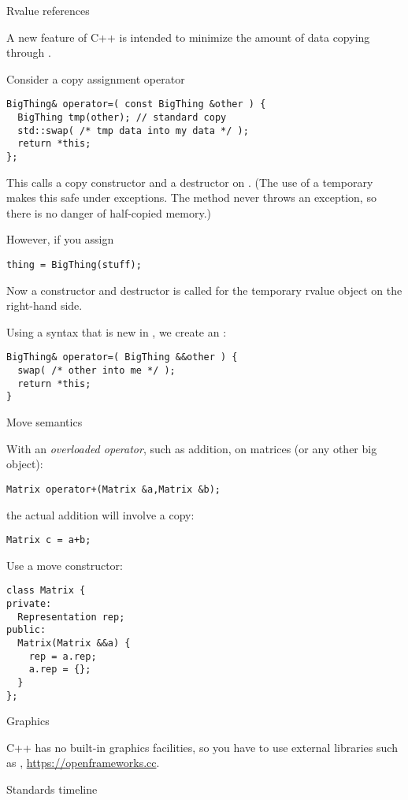  {Rvalue references}
\label{sec:rvalue-ref}

A new feature of C++ is
intended to minimize the amount of data copying through
.

Consider a copy assignment operator
\begin{lstlisting}
BigThing& operator=( const BigThing &other ) {
  BigThing tmp(other); // standard copy
  std::swap( /* tmp data into my data */ );
  return *this;
};
\end{lstlisting}
This calls a copy constructor and a destructor on . (The use of
a temporary makes this safe under exceptions. The 
method never throws an exception, so there is no danger of half-copied
memory.)

However, if you assign
\begin{lstlisting}
thing = BigThing(stuff);
\end{lstlisting}
Now a constructor and destructor is called for the temporary rvalue object on
the right-hand side.

Using a syntax that is new in , we create an
:
\begin{lstlisting}
BigThing& operator=( BigThing &&other ) {
  swap( /* other into me */ );
  return *this;
}
\end{lstlisting}

 {Move semantics}

With an
\emph{overloaded operator},
such as addition,
on matrices (or any other big object):
\begin{lstlisting}
Matrix operator+(Matrix &a,Matrix &b);
\end{lstlisting}
the actual addition will involve a copy:
\begin{lstlisting}
Matrix c = a+b;
\end{lstlisting}

Use a move constructor:
\begin{lstlisting}
class Matrix {
private:
  Representation rep;
public:
  Matrix(Matrix &&a) {
    rep = a.rep;
    a.rep = {};
  }
};
\end{lstlisting}

 {Graphics}

C++ has no built-in graphics facilities, so you have to use external
libraries such as ,
\url{https://openframeworks.cc}.

 {Standards timeline}
\label{sec:cpp-standards}

